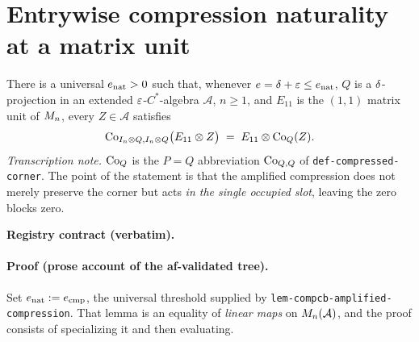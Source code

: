 \section{Entrywise compression naturality at a matrix unit}\label{sec:compcb-entrywise-compression-naturality}

\begin{lemma}\label{lem:compcb-entrywise-compression-naturality}
There is a universal $e_{\mathrm{nat}}>0$ such that, whenever
$e=\delta+\varepsilon\le e_{\mathrm{nat}}$, $Q$ is a $\delta$-projection in an extended
$\varepsilon$-$C^*$-algebra $\mathcal A$, $n\ge1$, and $E_{11}$ is the $(1,1)$ matrix unit of
$M_{n}$, every $Z\in\mathcal A$ satisfies
\begin{equation}\label{eq:ecn-main}
  \mathrm{Co}_{I_{n}\otimes Q,I_{n}\otimes Q}\bigl(E_{11}\otimes Z\bigr)\;=\;E_{11}\otimes\mathrm{Co}_{Q}(Z).
\end{equation}
\emph{Transcription note.} $\mathrm{Co}_{Q}$ is the $P=Q$ abbreviation $\mathrm{Co}_{Q,Q}$ of
\texttt{def-compressed-corner}. The point of the statement is that the amplified
compression does not merely preserve the corner but acts \emph{in the single occupied
slot}, leaving the zero blocks zero.
\end{lemma}

\noindent\textbf{Registry contract (verbatim).}

\paragraph{Proof (prose account of the af-validated tree).}
Set $e_{\mathrm{nat}}:=e_{\mathrm{cmp}}$, the universal threshold supplied by
\texttt{lem-compcb-amplified-compression}. That lemma is an equality of \emph{linear
maps} on $M_{n}(\mathcal A)$, and the proof consists of specializing it and then
evaluating.

